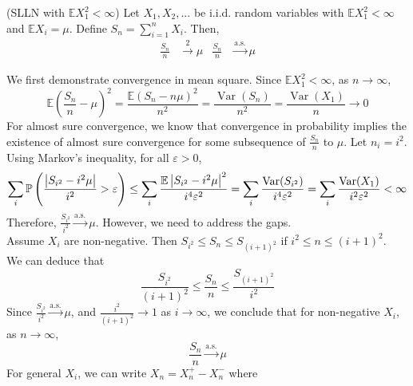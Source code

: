 \documentclass{huhtakm-template-book}
\newcommand{\prob}{\mathbb{P}}
\newcommand{\expect}{\mathbb{E}}
\DeclareMathOperator{\Var}{Var}
\begin{document}
    \begin{thm}(SLLN with $\expect X_{1}^{2}<\infty$) Let $X_{1},X_{2},\dots$ be i.i.d. random variables with $\expect X_{1}^{2}<\infty$ and $\expect X_{i}=\mu$. Define $S_{n}=\sum_{i=1}^{n}X_{i}$. Then,
        \begin{align*}
            \frac{S_{n}}{n}&\xrightarrow{2}\mu & \frac{S_{n}}{n}&\xrightarrow{\text{a.s.}}\mu
        \end{align*}
    \end{thm}
    \begin{proofing}
        We first demonstrate convergence in mean square. Since $\expect X_{1}^{2}<\infty$, as $n\to\infty$,
        \begin{equation*}
            \expect\left(\frac{S_{n}}{n}-\mu\right)^{2}=\frac{\expect(S_{n}-n\mu)^{2}}{n^{2}}=\frac{\Var(S_{n})}{n^{2}}=\frac{\Var(X_{1})}{n}\to 0
        \end{equation*}
        For almost sure convergence, we know that convergence in probability implies the existence of almost sure convergence for some subsequence of $\frac{S_{n}}{n}$ to $\mu$. Let $n_{i}=i^{2}$. Using Markov's inequality, for all $\varepsilon>0$,
        \begin{equation*}
            \sum_{i}\prob\left(\frac{\abs{S_{i^{2}}-i^{2}\mu}}{i^{2}}>\varepsilon\right)\leq\sum_{i}\frac{\expect\abs{S_{i^{2}}-i^{2}\mu}^{2}}{i^{4}\varepsilon^{2}}=\sum_{i}\frac{\Var(S_{i^{2}})}{i^{4}\varepsilon^{2}}=\sum_{i}\frac{\Var(X_{1})}{i^{2}\varepsilon^{2}}<\infty
        \end{equation*}
        Therefore, $\frac{S_{i^{2}}}{i^{2}}\xrightarrow{\text{a.s.}}\mu$. However, we need to address the gaps.\\
        Assume $X_{i}$ are non-negative. Then $S_{i^{2}}\leq S_{n}\leq S_{(i+1)^{2}}$ if $i^{2}\leq n\leq (i+1)^{2}$.\\
        We can deduce that
        \begin{equation*}
            \frac{S_{i^{2}}}{(i+1)^{2}}\leq\frac{S_{n}}{n}\leq\frac{S_{(i+1)^{2}}}{i^{2}}
        \end{equation*}
        Since $\frac{S_{i^{2}}}{i^{2}}\xrightarrow{\text{a.s.}}\mu$, and $\frac{i^{2}}{(i+1)^{2}}\to 1$ as $i\to\infty$, we conclude that for non-negative $X_{i}$, as $n\to\infty$,
        \begin{equation*}
            \frac{S_{n}}{n}\xrightarrow{\text{a.s.}}\mu
        \end{equation*}
        For general $X_{i}$, we can write $X_{n}=X_{n}^{+}-X_{n}^{-}$ where

\end{proofing}
\end{document}
